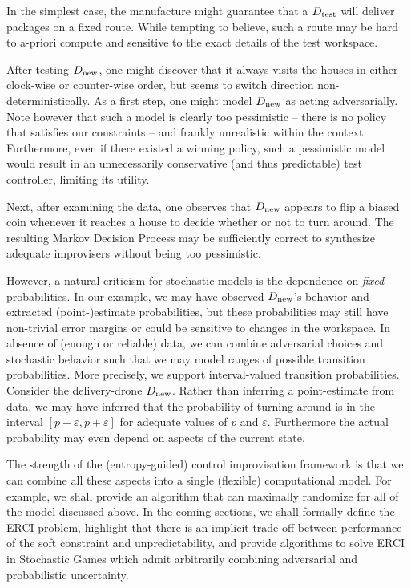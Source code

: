In the simplest case, the manufacture might guarantee that a
${D_{\text{test}}}$ will deliver packages on a fixed route. While tempting to
believe, such a route may be hard to a-priori compute and sensitive to
the exact details of the test workspace.

After testing ${D_{\text{new}}}$, one might discover that it always visits
the houses in either clock-wise or counter-wise order, but seems to
switch direction non-deterministically.  As a first step, one might
model ${D_{\text{new}}}$ as acting adversarially. Note however that such a
model is clearly too pessimistic -- there is no policy that satisfies
our constraints -- and frankly unrealistic within the context.
Furthermore, even if there existed a winning policy, such a pessimistic
model would result in an unnecessarily conservative (and thus predictable)
test controller, limiting its utility.

Next, after examining the data, one observes that ${D_{\text{new}}}$ appears
to flip a biased coin whenever it reaches a house to decide whether or
not to turn around. The resulting Markov Decision Process may be
sufficiently correct to synthesize adequate improvisers without
being too pessimistic.

 However, a natural criticism for stochastic
models is the dependence on \emph{fixed} probabilities.  In our
example, we may have observed ${D_{\text{new}}}$'s behavior and extracted
(point-)estimate probabilities, but these probabilities may still have
non-trivial error margins or could be sensitive to changes in the
workspace.  In absence of (enough or reliable) data, we can combine
adversarial choices and stochastic behavior such that we may model
ranges of possible transition probabilities.  More precisely, we
support interval-valued transition probabilities.  Consider the
delivery-drone ${D_{\text{new}}}$. Rather than inferring a point-estimate
from data, we may have inferred that the probability of turning around
is in the interval $[p - \varepsilon, p + \varepsilon]$ for adequate
values of $p$ and $\varepsilon$.  Furthermore the actual probability
may even depend on aspects of the current state.

The strength of the (entropy-guided) control improvisation framework
is that we can combine all these aspects into a single (flexible)
computational model. For example, we shall provide an algorithm that
can maximally randomize for all of the model discussed above. In the
coming sections, we shall formally define the ERCI problem, highlight
that there is an implicit trade-off between performance of the soft
constraint and unpredictability, and provide algorithms to solve ERCI
in Stochastic Games which admit arbitrarily combining adversarial and
probabilistic uncertainty.

